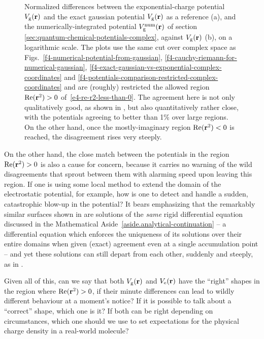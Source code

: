 \begin{figure}[!htbp]
{  Normalized differences between the exponential-charge potential $V_\mathrm{g}(\vb{r})$ and the exact gaussian potential $V_\mathrm{g}(\vb{r})$ as a reference (a), and the numerically-integrated potential $V_\mathrm{g}^{\mathrm{num}}(\vb{r})$ of section \ref{sec:quantum-chemical-potentials-complex}, against $V_\mathrm{g}(\vb{r})$ (b), on a logarithmic scale. The plots use the same cut over complex space as Figs.~\ref{f4-numerical-potential-from-gaussian}, \ref{f4-cauchy-riemann-for-numerical-gaussian}, \ref{f4-exact-gaussian-vs-exponential-complex-coordinates} and \ref{f4-potentials-comparison-restricted-complex-coordinates} and are (roughly) restricted the allowed region $\Re(\vb{r}^2)>0$ of~\eqref{e4-re-r2-less-than-0}. The agreement here is not only qualitatively good, as shown in , but also quantitatively rather close, with the potentials agreeing to better than 1\% over large regions. On the other hand, once the mostly-imaginary region $\Re(\vb{r}^2)<0$ is reached, the disagreement rises very steeply.
  }
  \label{f4-quantitative-agreements-between-potentials}
\end{figure}




On the other hand, the close match between the potentials in the region $\Re(\vb{r}^2)>0$ is also a cause for concern, because it carries no warning of the wild disagreements that sprout between them with alarming speed upon leaving this region. If one is using some local method to extend the domain of the electrostatic potential, for example, how is one to detect and handle a sudden, catastrophic blow-up in the potential? It bears emphasizing that the remarkably similar surfaces shown in  are solutions of the \textit{same} rigid differential equation discussed in the Mathematical Aside~\ref{aside.analytical-continuation} -- a differential equation which enforces the uniqueness of its solutions over their entire domains when given (exact) agreement even at a single accumulation point -- and yet these solutions can still depart from each other, suddenly and steeply, as in .


Given all of this, can we say that both $V_\mathrm{g}(\vb{r})$ and $V_\mathrm{e}(\vb{r})$ have the ``right'' shapes in the region where $\Re(\vb{r}^2)>0$, if their minute differences can lead to wildly different behaviour at a moment's notice? If it is possible to talk about a ``correct'' shape, which one is it? If both can be right depending on circumstances, which one should we use to set expectations for the physical charge density in a real-world molecule?






